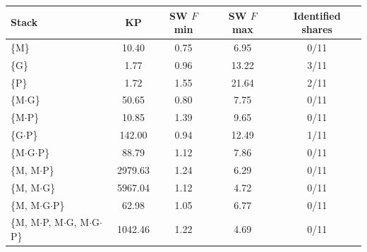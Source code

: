 \begin{tabular}{@{}lcccc@{}}
\toprule
Stack & KP & SW $F$ min & SW $F$ max & Identified shares \\
\midrule
\{M\} & 10.40 & 0.75 & 6.95 & 0/11 \\
\{G\} & 1.77 & 0.96 & 13.22 & 3/11 \\
\{P\} & 1.72 & 1.55 & 21.64 & 2/11 \\
\{M$\cdot$G\} & 50.65 & 0.80 & 7.75 & 0/11 \\
\{M$\cdot$P\} & 10.85 & 1.39 & 9.65 & 0/11 \\
\{G$\cdot$P\} & 142.00 & 0.94 & 12.49 & 1/11 \\
\{M$\cdot$G$\cdot$P\} & 88.79 & 1.12 & 7.86 & 0/11 \\
\addlinespace
\{M, M$\cdot$P\} & 2979.63 & 1.24 & 6.29 & 0/11 \\
\{M, M$\cdot$G\} & 5967.04 & 1.12 & 4.72 & 0/11 \\
\{M, M$\cdot$G$\cdot$P\} & 62.98 & 1.05 & 6.77 & 0/11 \\
\{M, M$\cdot$P, M$\cdot$G, M$\cdot$G$\cdot$P\} & 1042.46 & 1.22 & 4.69 & 0/11 \\
\bottomrule
\end{tabular}
